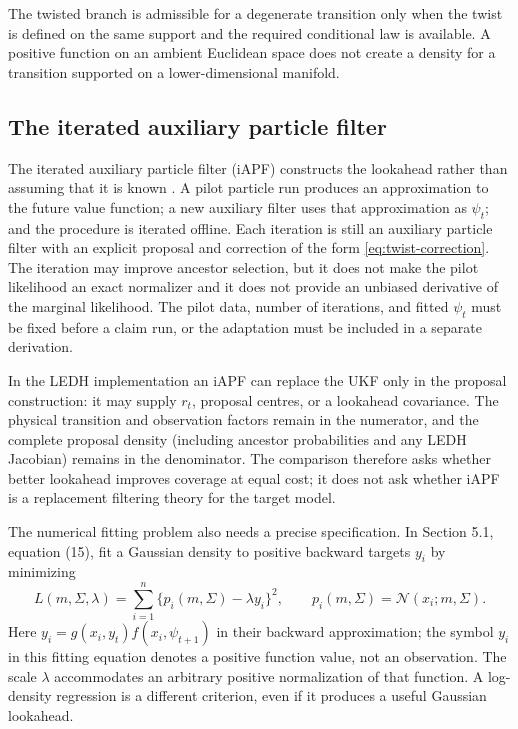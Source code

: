 \documentclass[11pt]{article}
\begin{document}
The twisted branch is admissible for a degenerate transition only when the
twist is defined on the same support and the required conditional law is
available. A positive function on an ambient Euclidean space does not create a
density for a transition supported on a lower-dimensional manifold.

\subsection{The iterated auxiliary particle filter}

The iterated auxiliary particle filter (iAPF) constructs the lookahead rather
than assuming that it is known \citep{guarniero2017iapf}. A pilot particle run
produces an approximation to the future value function; a new auxiliary filter
uses that approximation as $\psi_t$; and the procedure is iterated offline.
Each iteration is still an auxiliary particle filter with an explicit proposal
and correction of the form \eqref{eq:twist-correction}. The iteration may
improve ancestor selection, but it does not make the pilot likelihood an exact
normalizer and it does not provide an unbiased derivative of the marginal
likelihood. The pilot data, number of iterations, and fitted $\psi_t$ must be
fixed before a claim run, or the adaptation must be included in a separate
derivation.

In the LEDH implementation an iAPF can replace the UKF only in the proposal
construction: it may supply $r_t$, proposal centres, or a lookahead covariance.
The physical transition and observation factors remain in the numerator, and
the complete proposal density (including ancestor probabilities and any LEDH
Jacobian) remains in the denominator. The comparison therefore asks whether
better lookahead improves coverage at equal cost; it does not ask whether iAPF
is a replacement filtering theory for the target model.

The numerical fitting problem also needs a precise specification. In
Section 5.1, equation (15), \citet{guarniero2017iapf} fit a Gaussian density
to positive backward targets $y_i$ by minimizing
\begin{equation}
 L(m,\Sigma,\lambda)
   =\sum_{i=1}^n\{p_i(m,\Sigma)-\lambda y_i\}^2,
 \qquad p_i(m,\Sigma)=\mathcal N(x_i;m,\Sigma).
 \label{eq:iapf-density-fit}
\end{equation}
Here $y_i=g(x_i,y_t)f(x_i,\psi_{t+1})$ in their backward approximation;
the symbol $y_i$ in this fitting equation denotes a positive function value,
not an observation. The scale $\lambda$ accommodates an arbitrary positive
normalization of that function. A log-density regression is a different
criterion, even if it produces a useful Gaussian lookahead.
\end{document}

